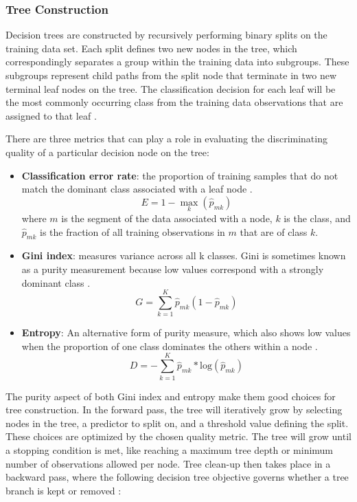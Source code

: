 \subsubsection{Tree Construction}
Decision trees are constructed by recursively performing binary splits on the training data set. Each split defines two new nodes in the tree, which correspondingly separates a group within the training data into subgroups. These subgroups represent child paths from the split node that terminate in two new terminal leaf nodes on the tree. The classification decision for each leaf will be the most commonly occurring class from the training data observations that are assigned to that leaf \citep[p. 311]{james_introduction_2013}.

There are three metrics that can play a role in evaluating the discriminating quality of a particular decision node on the tree:

\begin{itemize}
    \item \textbf{Classification error rate}: the proportion of training samples that do not match the dominant class associated with a leaf node \citep[p. 312]{james_introduction_2013}.
    \begin{equation} \label{eq:error_rate}
        E = 1 - \max_k(\hat{p}_{mk})
    \end{equation}
    where $m$ is the segment of the data associated with a node, $k$ is the class, and $\hat{p}_{mk}$ is the fraction of all training observations in $m$ that are of class $k$. 
    \item \textbf{Gini index}: measures variance across all k classes. Gini is sometimes known as a purity measurement because low values correspond with a strongly dominant class \citep[p. 312]{james_introduction_2013}.
    \begin{equation}
        G = \sum_{k=1}^{K}{\hat{p}_{mk}(1-\hat{p}_{mk})}
    \end{equation}
    \item \textbf{Entropy}: An alternative form of purity measure, which also shows low values when the proportion of one class dominates the others within a node \citep[p. 312]{james_introduction_2013}.
    \begin{equation}
        D = -\sum_{k=1}^{K}{\hat{p}_{mk}* \text{log}(\hat{p}_{mk})}
    \end{equation}
\end{itemize}

The purity aspect of both Gini index and entropy make them good choices for tree construction. In the forward pass, the tree will iteratively grow by selecting nodes in the tree, a predictor to split on, and a threshold value defining the split. These choices are optimized by the chosen quality metric. The tree will grow until a stopping condition is met, like reaching a maximum tree depth or minimum number of observations allowed per node. Tree clean-up then takes place in a backward pass, where the following decision tree objective governs whether a tree branch is kept or removed \citep[p. 309]{james_introduction_2013}:

